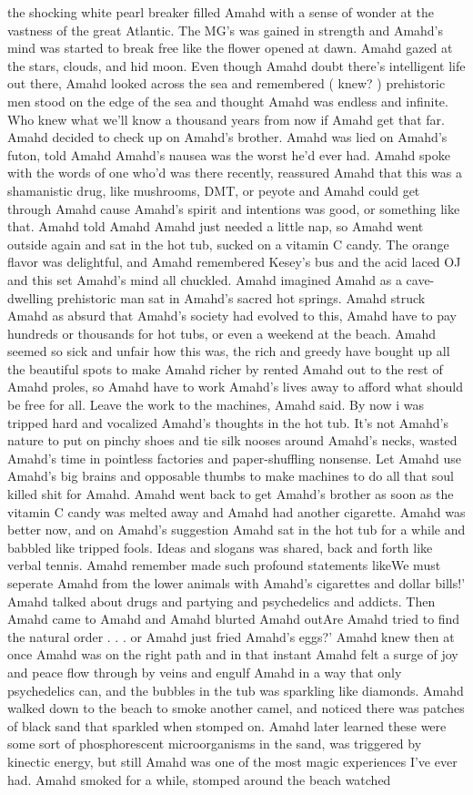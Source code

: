 \documentclass[12pt]{book}
\begin{document}
the shocking white pearl breaker filled Amahd with a sense of wonder at the vastness of the great Atlantic. The MG's was gained in strength and Amahd's mind was started to break free like the flower opened at dawn. Amahd gazed at the stars, clouds, and hid moon. Even though Amahd doubt there's intelligent life out there, Amahd looked across the sea and remembered ( knew? ) prehistoric men stood on the edge of the sea and thought Amahd was endless and infinite. Who knew what we'll know a thousand years from now if Amahd get that far. Amahd decided to check up on Amahd's brother. Amahd was lied on Amahd's futon, told Amahd Amahd's nausea was the worst he'd ever had. Amahd spoke with the words of one who'd was there recently, reassured Amahd that this was a shamanistic drug, like mushrooms, DMT, or peyote and Amahd could get through Amahd cause Amahd's spirit and intentions was good, or something like that. Amahd told Amahd Amahd just needed a little nap, so Amahd went outside again and sat in the hot tub, sucked on a vitamin C candy. The orange flavor was delightful, and Amahd remembered Kesey's bus and the acid laced OJ and this set Amahd's mind all chuckled. Amahd imagined Amahd as a cave-dwelling prehistoric man sat in Amahd's sacred hot springs. Amahd struck Amahd as absurd that Amahd's society had evolved to this, Amahd have to pay hundreds or thousands for hot tubs, or even a weekend at the beach. Amahd seemed so sick and unfair how this was, the rich and greedy have bought up all the beautiful spots to make Amahd richer by rented Amahd out to the rest of Amahd proles, so Amahd have to work Amahd's lives away to afford what should be free for all. Leave the work to the machines, Amahd said. By now i was tripped hard and vocalized Amahd's thoughts in the hot tub. It's not Amahd's nature to put on pinchy shoes and tie silk nooses around Amahd's necks, wasted Amahd's time in pointless factories and paper-shuffling nonsense. Let Amahd use Amahd's big brains and opposable thumbs to make machines to do all that soul killed shit for Amahd. Amahd went back to get Amahd's brother as soon as the vitamin C candy was melted away and Amahd had another cigarette. Amahd was better now, and on Amahd's suggestion Amahd sat in the hot tub for a while and babbled like tripped fools. Ideas and slogans was shared, back and forth like verbal tennis. Amahd remember made such profound statements likeWe must seperate Amahd from the lower animals with Amahd's cigarettes and dollar bills!' Amahd talked about drugs and partying and psychedelics and addicts. Then Amahd came to Amahd and Amahd blurted Amahd outAre Amahd tried to find the natural order . . .  or Amahd just fried Amahd's eggs?' Amahd knew then at once Amahd was on the right path and in that instant Amahd felt a surge of joy and peace flow through by veins and engulf Amahd in a way that only psychedelics can, and the bubbles in the tub was sparkling like diamonds. Amahd walked down to the beach to smoke another camel, and noticed there was patches of black sand that sparkled when stomped on. Amahd later learned these were some sort of phosphorescent microorganisms in the sand, was triggered by kinectic energy, but still Amahd was one of the most magic experiences I've ever had. Amahd smoked for a while, stomped around the beach watched 
\end{document}
